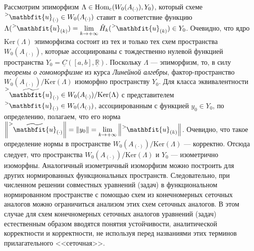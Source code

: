 Рассмотрим эпиморфизм $\Lambda \in \mathrm{Hom}_c(W_0(A_{(\cdot)}), Y_0)$, который схеме $\tensor[^{>}]{\mathbfit{u}}{_{(\cdot)}} \in W_0(A_{(\cdot)})$ ставит в соответствие функцию $\Lambda(\tensor[^{>}]{\mathbfit{u}}{_{(k)}}) = \lim\limits_{k \to +\infty}{\hat{H}_k(\tensor[^{>}]{\mathbfit{u}}{_{(k)}})} \in Y_0$. Очевидно, что ядро $\mathrm{Ker}(\Lambda)$ эпиморфизма состоит из тех и только тех схем пространства $W_0(A_{(\cdot)})$, которые ассоциированы с тождественно нулевой функцией пространства $Y_0 = \underline{C}([a, b], \underline{\mathbb{R}})$. Поскольку $\Lambda$ --- эпиморфизм, то, в силу \textit{теоремы о гомоморфизме} из курса \textit{Линейной алгебры}, фактор-пространство $W_0(A_{(\cdot)}) / \mathrm{Ker}(\Lambda)$ изоморфно пространству $Y_0$. Для класса эквивалентности $\tensor[^{>}]{\widetilde{\mathbfit{u}}}{_{(\cdot)}} \in W_0(A_{(\cdot)}) / \mathrm{Ker}(\Lambda)$ с представителем $\tensor[^{>}]{\mathbfit{u}}{_{(\cdot)}} \in W_0(A_{(\cdot)})$, ассоциированным с функцией $y_0 \in Y_0$, по определению, полагаем, что его норма $\norm{\tensor[^{>}]{\widetilde{\mathbfit{u}}}{_{(\cdot)}}} = \norm{y_0} = \lim\limits_{k \to +\infty}{\norm{\tensor[^{>}]{\mathbfit{u}}{_{(k)}}}}$. Очевидно, что такое определение нормы в пространстве $W_0(A_{(\cdot)})/\mathrm{Ker}(\Lambda)$ --- корректно. Отсюда следует, что пространства $W_0(A_{(\cdot)}) / \mathrm{Ker}(\Lambda)$ и $Y_0$ --- изометрично изоморфны. Аналогичный изометричный изоморфизм можно построить для других нормированных функциональных пространств. Следовательно, при численном решении совместных уравнений (задач) в функциональном нормированном пространстве с помощью схем из конечномерных сеточных аналогов можно ограничиться анализом этих схем сеточных аналогов. В этом случае для схем конечномерных сеточных аналогов уравнений (задач) естественным образом вводятся понятия устойчивости, аналитической корректности и корректности, не используя перед названиями этих терминов прилагательного <<сеточная>>.
